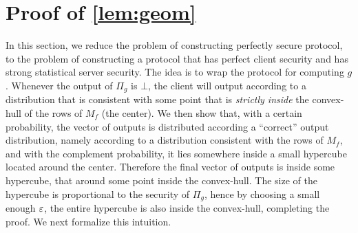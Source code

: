 \documentclass{llncs}
\newcommand{\bnote}[1]{\authnote{Bar}{#1}}
\begin{document}

\section{Proof of \texorpdfstring{\cref{lem:geom}}{Lemma 2}}\label{sec:geom}
In this section, we reduce the problem of constructing perfectly secure protocol, to the problem of constructing a protocol that has perfect client security and has strong statistical server security. The idea is to wrap the protocol for computing $g$. Whenever the output of $\Pi_g$ is $\bot$, the client will output according to a distribution that is consistent with some point that is \emph{strictly inside} the convex-hull of the rows of $M_f$ (\eg the center).
\ifdefined\IsFV
We then show that, with a certain probability, the vector of outputs is distributed according a ``correct'' output distribution, namely according to a distribution consistent with the rows of $M_f$, and with the complement probability, it lies somewhere inside a small hypercube located around the center. Therefore the final vector of outputs is inside some hypercube, that around some point inside the convex-hull. The size of the hypercube is proportional to the security of $\Pi_g$, hence by choosing a small enough $\varepsilon$, the entire hypercube is also inside the convex-hull, completing the proof. We next formalize this intuition.
\else\fi
\end{document}

